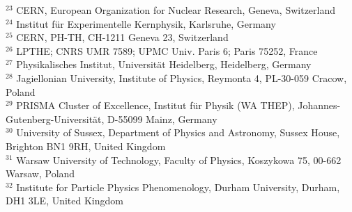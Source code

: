 { $ ^{23}$ CERN, European Organization for Nuclear Research, Geneva, Switzerland \\
 $ ^{24}$ Institut f\" ur Experimentelle Kernphysik, Karlsruhe, Germany \\
 $ ^{25}$ CERN, PH-TH, CH-1211 Geneva 23, Switzerland \\
 $ ^{26}$ LPTHE; CNRS UMR 7589; UPMC Univ. Paris 6; Paris 75252, France \\
 $ ^{27}$ Physikalisches Institut, Universit\"at Heidelberg, Heidelberg, Germany \\
 $ ^{28}$ Jagiellonian University, Institute of Physics, Reymonta 4, PL-30-059 Cracow, Poland \\
 $ ^{29}$ PRISMA Cluster of Excellence, Institut f\"ur Physik (WA THEP), Johannes-Gutenberg-Universit\" at, D-55099 Mainz, Germany \\
 $ ^{30}$ University of Sussex, Department of Physics and Astronomy, Sussex House, Brighton BN1 9RH, United Kingdom \\
 $ ^{31}$ Warsaw University of Technology, Faculty of Physics, Koszykowa 75, 00-662 Warsaw, Poland \\
 $ ^{32}$ Institute for Particle Physics Phenomenology, Durham University, Durham, DH1 3LE, United Kingdom \\
}
%
